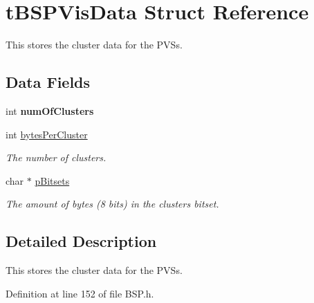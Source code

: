 \hypertarget{structt_b_s_p_vis_data}{}\section{t\+B\+S\+P\+Vis\+Data Struct Reference}
\label{structt_b_s_p_vis_data}


This stores the cluster data for the P\+VS\textquotesingle{}s.  


\subsection*{Data Fields}
\begin{DoxyCompactItemize}
\item 
int {\bfseries num\+Of\+Clusters}\hypertarget{structt_b_s_p_vis_data_ab3043a4020d2f7a3798f4a51d64ce4dc}{}\label{structt_b_s_p_vis_data_ab3043a4020d2f7a3798f4a51d64ce4dc}

\item 
int \hyperlink{structt_b_s_p_vis_data_a3b536ed777e4d1265917193322336648}{bytes\+Per\+Cluster}\hypertarget{structt_b_s_p_vis_data_a3b536ed777e4d1265917193322336648}{}\label{structt_b_s_p_vis_data_a3b536ed777e4d1265917193322336648}

\begin{DoxyCompactList}\small\item\em The number of clusters. \end{DoxyCompactList}\item 
char $\ast$ \hyperlink{structt_b_s_p_vis_data_ad6ac952c9210f20219bd48c10488c959}{p\+Bitsets}\hypertarget{structt_b_s_p_vis_data_ad6ac952c9210f20219bd48c10488c959}{}\label{structt_b_s_p_vis_data_ad6ac952c9210f20219bd48c10488c959}

\begin{DoxyCompactList}\small\item\em The amount of bytes (8 bits) in the cluster\textquotesingle{}s bitset. \end{DoxyCompactList}\end{DoxyCompactItemize}


\subsection{Detailed Description}
This stores the cluster data for the P\+VS\textquotesingle{}s. 

Definition at line 152 of file B\+S\+P.\+h.

